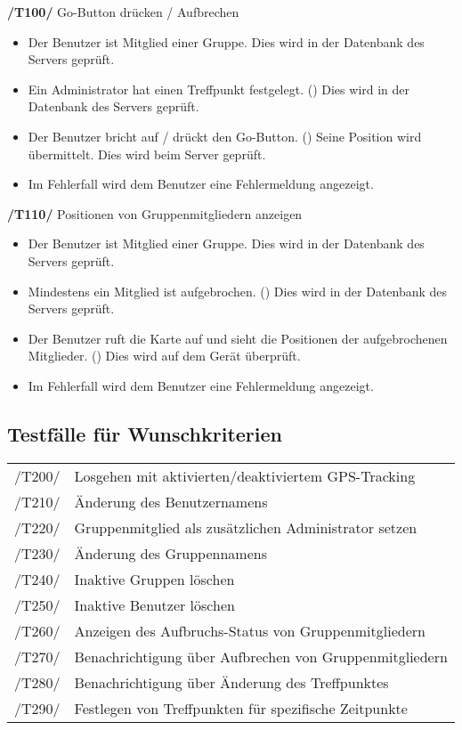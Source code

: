 \textbf{/T100/} Go-Button drücken / Aufbrechen \\ %
\begin{itemize}
\setlength{\itemsep}{0pt}
\item Der Benutzer ist Mitglied einer Gruppe. Dies wird in der Datenbank des Servers geprüft.
\item Ein Administrator hat einen Treffpunkt festgelegt. () Dies wird in der Datenbank des Servers geprüft.
\item Der Benutzer bricht auf / drückt den Go-Button. ()
Seine Position wird übermittelt.
Dies wird beim Server geprüft.
\item Im Fehlerfall wird dem Benutzer eine Fehlermeldung angezeigt.
\end{itemize}


\textbf{/T110/} Positionen von Gruppenmitgliedern anzeigen \\
\begin{itemize}
\setlength{\itemsep}{0pt}
\item Der Benutzer ist Mitglied einer Gruppe. Dies wird in der Datenbank des Servers geprüft.
\item Mindestens ein Mitglied ist aufgebrochen. () Dies wird in der Datenbank des Servers geprüft.
\item Der Benutzer ruft die Karte auf und sieht die Positionen der
aufgebrochenen Mitglieder. () Dies wird auf dem Gerät überprüft.
\item Im Fehlerfall wird dem Benutzer eine Fehlermeldung angezeigt.
\end{itemize}



\subsection{Testfälle für Wunschkriterien}
\begin{tabular}{ll}
/T200/ & Losgehen mit aktivierten/deaktiviertem GPS-Tracking \\ %
/T210/ & Änderung des Benutzernamens \\
/T220/ & Gruppenmitglied als zusätzlichen Administrator setzen \\
/T230/ & Änderung des Gruppennamens \\
/T240/ & Inaktive Gruppen löschen \\
/T250/ & Inaktive Benutzer löschen \\
/T260/ & Anzeigen des Aufbruchs-Status von Gruppenmitgliedern \\
/T270/ & Benachrichtigung über Aufbrechen von Gruppenmitgliedern \\
/T280/ & Benachrichtigung über Änderung des Treffpunktes \\
/T290/ & Festlegen von Treffpunkten für spezifische Zeitpunkte \\
\end{tabular}
